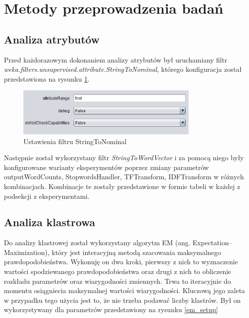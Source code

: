 \documentclass{classrep}
\begin{document}
    \section{Metody przeprowadzenia badań} {

        \subsection{Analiza atrybutów} {
            Przed każdorazowym dokonaniem analizy atrybutów był uruchamiany filtr
            \emph{weka.filters.unsupervised.attribute.StringToNominal}, którego
            konfiguracja został przedstawiona na rysunku \ref{string_to_nominal_setup}.

            \begin{figure}[!htbp]
                \centering
                \includegraphics[width=0.8\textwidth]{img/string_to_nominal_setup.png}
                \caption{Ustawienia filtru StringToNominal}
                \label{string_to_nominal_setup}
            \end{figure}
            \FloatBarrier

            Następnie został wykorzystany filtr \textit{StringToWordVector} i za pomocą
            niego były konfigurowane warianty eksperymentów poprzez zmiany parametrów
            outputWordCounts, StopwordsHandler, TFTransform, IDFTransform w różnych
            kombinacjach. Kombinacje te zostały przedstawione w formie tabeli w każdej
            z podsekcji z eksperymentami.
        }

        \subsection{Analiza klastrowa} {
            Do analizy klastrowej został wykorzystany algorytm EM
            (ang. Expectation–Maximization), który jest interacyjną metodą szacowania
            maksymalnego prawdopodobieństwa. Wykonuję on dwa kroki, pierwszy z nich to
            wyznaczenie wartości spodziewanego prawdopodobieństwa oraz drugi z nich to
            obliczenie rozkładu parametrów oraz wiarygodności zmiennych. Trwa to
            iteracyjnie do momentu osiągniecia maksymalnej wartości wiarygodności.
            Kluczową jego zaleta w przypadku tego użycia jest to, że nie trzeba podawać
            liczby klastrów. Był on wykorzystywany dla parametrów przedstawiony na
            rysunku \ref{em_setup}

}}
\end{document}
